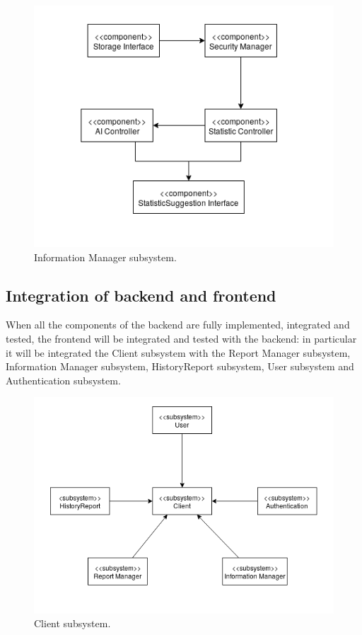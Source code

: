 \documentclass{report}
\begin{document}
\begin{figure}[!ht]
	\begin{center}
	\includegraphics[width=\textwidth]{img/InfoSub.png}
    \end{center}
    \label{fig:InfoSub}
	\caption{Information Manager subsystem.}
\end{figure}

\subsection{Integration of backend and frontend}
When all the components of the backend are fully implemented, integrated and tested, the frontend will be integrated and tested with the backend: in particular it will be integrated the Client subsystem with the Report Manager subsystem, Information Manager subsystem, HistoryReport subsystem, User subsystem and Authentication subsystem.
\begin{figure}[!ht]
	\begin{center}
	\includegraphics[width=\textwidth]{img/ClientSub.png}
    \end{center}
    \label{fig:ClientSub}
	\caption{Client subsystem.}
\end{figure}
\end{document}
